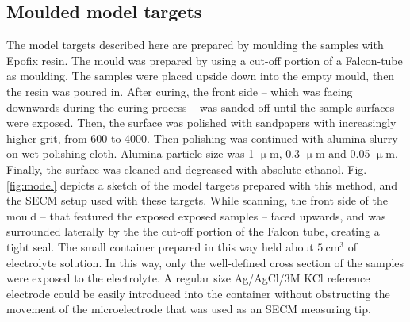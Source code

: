		\subsection{Moulded model targets}
The model targets described here are prepared by moulding the samples with Epofix resin.
The mould was prepared by using a cut-off portion of a Falcon-tube as moulding.
The samples were placed upside down into the empty mould, then the resin was poured in.
After curing, the front side -- which was facing downwards during the curing process -- was sanded off until the sample surfaces were exposed.
Then, the surface was polished with sandpapers with increasingly higher grit, from 600 to 4000.
Then polishing was continued with alumina slurry on wet polishing cloth.
Alumina particle size was 1 $\upmu$m, 0.3 $\upmu$m and 0.05 $\upmu$m.
Finally, the surface was cleaned and degreased with absolute ethanol.
Fig. \ref{fig:model} depicts a sketch of the model targets prepared with this method, and the SECM setup used with these targets.
While scanning, the front side of the mould -- that featured the exposed exposed samples -- faced upwards, and was surrounded laterally by the the cut-off portion of the Falcon tube, creating a tight seal. The small container prepared in this way held about $5~$cm$^3$ of electrolyte solution. In this way, only the well-defined cross section of the samples were exposed to the electrolyte.
A regular size Ag/AgCl/3M KCl reference electrode could be easily introduced into the container without obstructing the movement of the microelectrode that was used as an SECM measuring tip.

